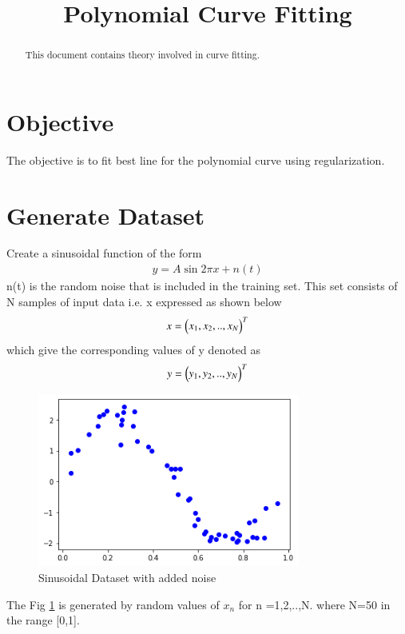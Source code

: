 \documentclass[journal,12pt,twocolumn]{IEEEtran}
\begin{document}
\makeatletter
{}
\makeatother
\let\StandardTheFigure\thefigure
\let\vec\mathbf
\renewcommand{\thefigure}{\theproblem}
\def\putbox#1#2#3{\makebox[0in][l]{\makebox[#1][l]{}\raisebox{\baselineskip}[0in][0in]{\raisebox{#2}[0in][0in]{#3}}}}
     \def\rightbox#1{\makebox[0in][r]{#1}}
     \def\centbox#1{\makebox[0in]{#1}}
     \def\topbox#1{\raisebox{-\baselineskip}[0in][0in]{#1}}
\vspace{3cm}
\title{Polynomial Curve Fitting}
\maketitle
\newpage
\bigskip
\renewcommand{\thefigure}{\theenumi}
\renewcommand{\thetable}{\theenumi}
\begin{abstract}
This document contains theory involved in curve fitting.
\end{abstract}
\section{\textbf{Objective}}
The objective is to fit best line for the polynomial curve using regularization.
\section{Generate Dataset}
Create a sinusoidal function of the form
\begin{align}
    y = A\sin{2\pi x} + n(t) \label{eq:1}
\end{align}
n(t) is the random noise that is included in the training set. This set consists of N samples of input data i.e. x expressed as shown below
\begin{align}
    x = \begin{pmatrix}x_{1}, x_{2}, .., x_{N}\end{pmatrix}^{T}
\end{align}
which give the corresponding values of y denoted as
\begin{align}
    y = \begin{pmatrix}y_{1}, y_{2}, .., y_{N}\end{pmatrix}^{T}
\end{align}
\begin{figure}[!h]
\begin{center}
\includegraphics[width=3.4in]{figs/fig1.png}
\end{center}
\caption{Sinusoidal Dataset with added noise}
\label{fig:1}
\end{figure}
The Fig \ref{fig:1} is generated by random values of $x_{n}$ for n =1,2,..,N.
where N=50 in the range [0,1].
\end{document}
